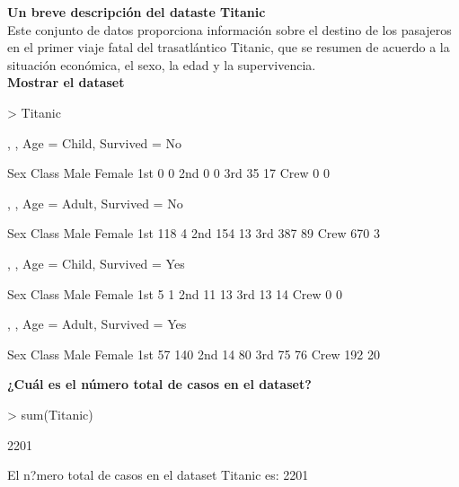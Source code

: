 \documentclass[6pt]{report}
\begin{document}
\textbf{Un breve descripción del dataste Titanic}\\
Este conjunto de datos proporciona información sobre el destino de los pasajeros en el primer viaje fatal del trasatlántico Titanic, que se resumen de acuerdo a la situación económica, el sexo, la edad y la supervivencia.\\

\textbf{Mostrar el dataset}
\begin{Schunk}
\begin{Sinput}
> Titanic
\end{Sinput}
\begin{Soutput}
, , Age = Child, Survived = No

      Sex
Class  Male Female
  1st     0      0
  2nd     0      0
  3rd    35     17
  Crew    0      0

, , Age = Adult, Survived = No

      Sex
Class  Male Female
  1st   118      4
  2nd   154     13
  3rd   387     89
  Crew  670      3

, , Age = Child, Survived = Yes

      Sex
Class  Male Female
  1st     5      1
  2nd    11     13
  3rd    13     14
  Crew    0      0

, , Age = Adult, Survived = Yes

      Sex
Class  Male Female
  1st    57    140
  2nd    14     80
  3rd    75     76
  Crew  192     20
\end{Soutput}
\end{Schunk}

\textbf{¿Cuál es el número total de casos en el dataset?}
\begin{Schunk}
\begin{Sinput}
> sum(Titanic)
\end{Sinput}
\begin{Soutput}
[1] 2201
\end{Soutput}
\end{Schunk}
El n?mero total de casos en el dataset Titanic es: 2201
\end{document}

